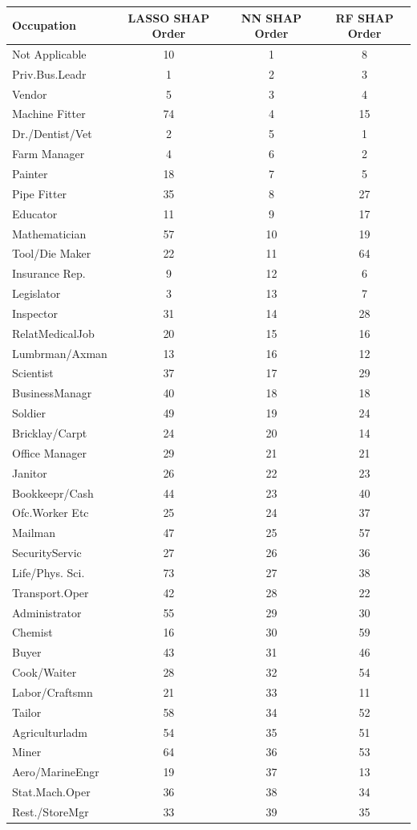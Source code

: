 \begin{tabular}{lccc}
\hline\hline
Occupation & LASSO SHAP Order & NN SHAP Order & RF SHAP Order \\
\hline
Not Applicable&10&1&8\\
Priv.Bus.Leadr&1&2&3\\
Vendor&5&3&4\\
Machine Fitter&74&4&15\\
Dr./Dentist/Vet&2&5&1\\
Farm Manager&4&6&2\\
Painter&18&7&5\\
Pipe Fitter&35&8&27\\
Educator&11&9&17\\
Mathematician&57&10&19\\
Tool/Die Maker&22&11&64\\
Insurance Rep.&9&12&6\\
Legislator&3&13&7\\
Inspector&31&14&28\\
RelatMedicalJob&20&15&16\\
Lumbrman/Axman&13&16&12\\
Scientist&37&17&29\\
BusinessManagr&40&18&18\\
Soldier&49&19&24\\
Bricklay/Carpt&24&20&14\\
Office Manager&29&21&21\\
Janitor&26&22&23\\
Bookkeepr/Cash&44&23&40\\
Ofc.Worker Etc&25&24&37\\
Mailman&47&25&57\\
SecurityServic&27&26&36\\
Life/Phys. Sci.&73&27&38\\
Transport.Oper&42&28&22\\
Administrator&55&29&30\\
Chemist&16&30&59\\
Buyer&43&31&46\\
Cook/Waiter&28&32&54\\
Labor/Craftsmn&21&33&11\\
Tailor&58&34&52\\
Agriculturladm&54&35&51\\
Miner&64&36&53\\
Aero/MarineEngr&19&37&13\\
Stat.Mach.Oper&36&38&34\\
Rest./StoreMgr&33&39&35\\

\end{tabular}
